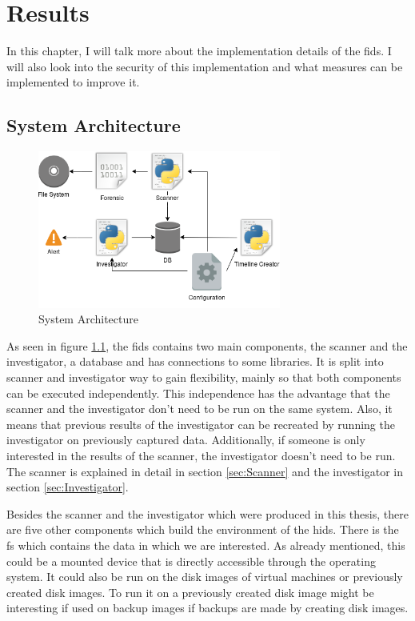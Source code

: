 
\chapter{Results}

In this chapter, I will talk more about the implementation details of the \gls{fids}. I will also look into the security of this implementation and what measures can be implemented to improve it. 

\section{System Architecture}
\label{sec:Architecture}

\begin{figure}[ht]
	\includegraphics[width=8cm]{../img/Overview_FIDS.png}
	\centering
	\caption{System Architecture}
	\label{fig:systemArchitecture}
\end{figure}

As seen in figure \ref{fig:systemArchitecture}, the \gls{fids} contains two main components, the scanner and the investigator, a database and has connections to some libraries. It is split into scanner and investigator way to gain flexibility, mainly so that both components can be executed independently. This independence has the advantage that the scanner and the investigator don't need to be run on the same system. Also, it means that previous results of the investigator can be recreated by running the investigator on previously captured data. Additionally, if someone is only interested in the results of the scanner, the investigator doesn't need to be run. The scanner is explained in detail in section \ref{sec:Scanner} and the investigator in section \ref{sec:Investigator}.

Besides the scanner and the investigator which were produced in this thesis, there are five other components which build the environment of the \gls{hids}. There is the \gls{fs} which contains the data in which we are interested. As already mentioned, this could be a mounted device that is directly accessible through the operating system. It could also be run on the disk images of virtual machines or previously created disk images. To run it on a previously created disk image might be interesting if used on backup images if backups are made by creating disk images. 

